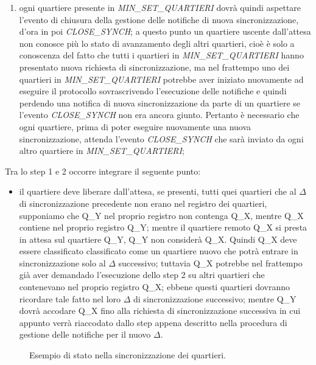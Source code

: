 \begin{enumerate}
\item ogni quartiere presente in \textit{MIN\_SET\_QUARTIERI} dovrà quindi aspettare l'evento di chiusura della gestione delle notifiche di nuova sincronizzazione, d'ora in poi \textit{CLOSE\_SYNCH}; a questo punto un quartiere uscente dall'attesa non conosce più lo stato di avanzamento degli altri quartieri, cioè è solo a conoscenza del fatto che tutti i quartieri in \textit{MIN\_SET\_QUARTIERI} hanno presentato nuova richiesta di sincronizzazione, ma nel frattempo uno dei quartieri in \textit{MIN\_SET\_QUARTIERI} potrebbe aver iniziato nuovamente ad eseguire il protocollo sovrascrivendo l'esecuzione delle notifiche e quindi perdendo una notifica di nuova sincronizzazione da parte di un quartiere se l'evento \textit{CLOSE\_SYNCH} non era ancora giunto. Pertanto è necessario che ogni quartiere, prima di poter eseguire nuovamente una nuova sincronizzazione, attenda l'evento \textit{CLOSE\_SYNCH} che sarà inviato da ogni altro quartiere in \textit{MIN\_SET\_QUARTIERI};
\end{enumerate}
Tra lo step 1 e 2 occorre integrare il seguente punto:  
\begin{itemize}
\item il quartiere deve liberare dall'attesa, se presenti, tutti quei quartieri che al $\Delta$ di sincronizzazione precedente non erano nel registro dei quartieri, supponiamo che Q\_Y nel proprio registro non contenga Q\_X, mentre Q\_X contiene nel proprio registro Q\_Y; mentre il quartiere remoto Q\_X si presta in attesa sul quartiere Q\_Y, Q\_Y non considerà Q\_X. Quindi Q\_X deve essere classificato classificato come un quartiere nuovo che potrà entrare in sincronizzazione solo al $\Delta$ successivo; tuttavia Q\_X potrebbe nel frattempo già aver demandado l'esecuzione dello step 2 su altri quartieri che contenevano nel proprio registro Q\_X; ebbene questi quartieri dovranno ricordare tale fatto nel loro $\Delta$ di sincronizzazione successivo; mentre Q\_Y dovrà accodare Q\_X fino alla richiesta di sincronizzazione successiva in cui appunto verrà riaccodato dallo step appena descritto nella procedura di gestione delle notifiche per il nuovo $\Delta$.
\end{itemize}

\begin{figure}[H] %
\caption{Esempio di stato nella sincronizzazione dei quartieri.}
\label{fig:speciation}
\end{figure}

